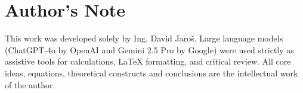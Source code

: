 \documentclass[12pt]{article}
\begin{document}
\section*{Author's Note}

This work was developed solely by Ing. David Jaroš.  
Large language models (ChatGPT-4o by OpenAI and Gemini 2.5 Pro by Google) were used strictly as assistive tools for calculations, LaTeX formatting, and critical review.  
All core ideas, equations, theoretical constructs and conclusions are the intellectual work of the author.
\end{document}
